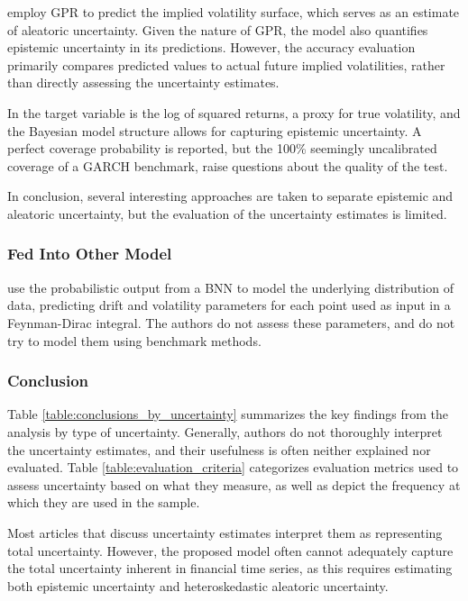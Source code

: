 \textcite{tegner2021probabilistic} employ GPR to predict the implied volatility surface, which serves as an estimate of aleatoric uncertainty. Given the nature of GPR, the model also quantifies epistemic uncertainty in its predictions. However, the accuracy evaluation primarily compares predicted values to actual future implied volatilities, rather than directly assessing the uncertainty estimates.

In \textcite{Parker2021BayesianHeteroskedastic} the target variable is the log of squared returns, a proxy for true volatility, and the Bayesian model structure allows for capturing epistemic uncertainty. A perfect coverage probability is reported, but the 100\% seemingly uncalibrated coverage of a GARCH benchmark, raise questions about the quality of the test.

In conclusion, several interesting approaches are taken to separate epistemic and aleatoric uncertainty, but the evaluation of the uncertainty estimates is limited. 

\subsubsection{Fed Into Other Model}

\textcite{soleymani2022longterm} use the probabilistic output from a BNN to model the underlying distribution of data, predicting drift and volatility parameters for each point used as input in a Feynman-Dirac integral. The authors do not assess these parameters, and do not try to model them using benchmark methods. 




\subsubsection{Conclusion}
Table \ref{table:conclusions_by_uncertainty} summarizes the key findings from the analysis by type of uncertainty. Generally, authors do not thoroughly interpret the uncertainty estimates, and their usefulness is often neither explained nor evaluated. Table \ref{table:evaluation_criteria} categorizes evaluation metrics used to assess uncertainty based on what they measure, as well as depict the frequency at which they are used in the sample.

Most articles that discuss uncertainty estimates interpret them as representing total uncertainty. However, the proposed model often cannot adequately capture the total uncertainty inherent in financial time series, as this requires estimating both epistemic uncertainty and heteroskedastic aleatoric uncertainty.   

